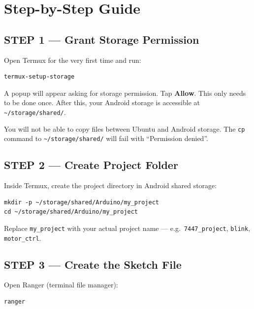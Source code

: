 \documentclass[12pt,a4paper,openany]{report}
\begin{document}
\section{Step-by-Step Guide}

\subsection{STEP 1 --- Grant Storage Permission}

Open Termux for the very first time and run:

\begin{lstlisting}[style=terminal]
termux-setup-storage
\end{lstlisting}

A popup will appear asking for storage permission. Tap \textbf{Allow}. This only needs to be done once. After this, your Android storage is accessible at \texttt{\textasciitilde/storage/shared/}.

\begin{warnbox}
\color{TermWhite}\ttfamily\small
You will not be able to copy files between Ubuntu and Android storage. The \texttt{cp} command to \texttt{\textasciitilde/storage/shared/} will fail with ``Permission denied''.
\end{warnbox}

\subsection{STEP 2 --- Create Project Folder}

Inside Termux, create the project directory in Android shared storage:

\begin{lstlisting}[style=shell]
mkdir -p ~/storage/shared/Arduino/my_project
cd ~/storage/shared/Arduino/my_project
\end{lstlisting}

Replace \texttt{my\_project} with your actual project name --- e.g.\ \texttt{7447\_project}, \texttt{blink}, \texttt{motor\_ctrl}.

\subsection{STEP 3 --- Create the Sketch File}

Open Ranger (terminal file manager):

\begin{lstlisting}[style=shell]
ranger
\end{lstlisting}
\end{document}
